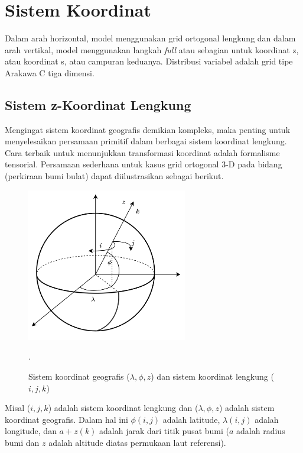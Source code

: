 \section[Sistem Koordinat]{Sistem Koordinat}
\begin{spacing}{1.5}
	Dalam arah horizontal, model menggunakan grid ortogonal lengkung dan dalam arah vertikal, model menggunakan langkah \textit{full} atau sebagian untuk koordinat z, atau koordinat s, atau campuran keduanya. Distribusi variabel adalah grid tipe Arakawa C tiga dimensi.
\subsection[Sistem z-Koordinat Lengkung]{Sistem z-Koordinat Lengkung}
	Mengingat sistem koordinat geografis demikian kompleks, maka penting untuk menyelesaikan persamaan primitif dalam berbagai sistem koordinat lengkung. Cara terbaik untuk menunjukkan transformasi koordinat adalah formalisme tensorial. Persamaan sederhana untuk kasus grid ortogonal 3-D pada bidang (perkiraan bumi bulat) dapat diilustrasikan sebagai berikut.
	\begin{figure}[H]
		\centering
		\includegraphics[width=7cm]{contents/sphere.png}
		\caption{Sistem koordinat geografis ($\lambda, \phi,z$) dan sistem koordinat lengkung ($i,j,k$) \protect{}}.
		\label{fig:sphere}
	\end{figure}
	Misal ($i,j,k$) adalah sistem koordinat lengkung dan ($\lambda, \phi,z$) adalah sistem koordinat geografis. Dalam hal ini $\phi(i,j)$ adalah latitude, $\lambda(i,j)$ adalah longitude, dan $a+z(k)$ adalah jarak dari titik pusat bumi ($a$ adalah radius bumi dan $z$ adalah altitude diatas permukaan laut referensi).
	

\end{spacing}
